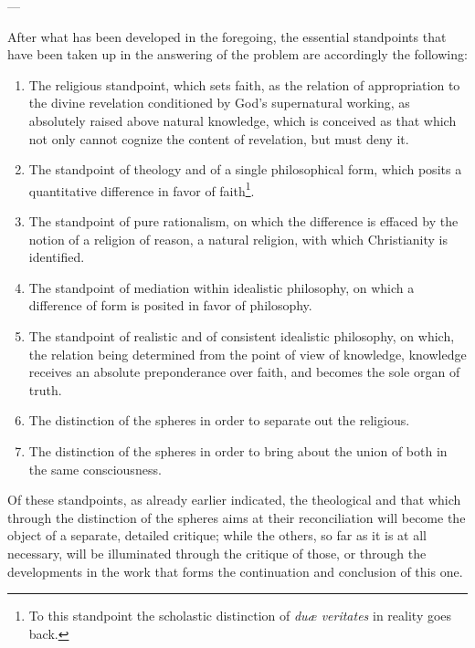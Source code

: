 \documentclass[12pt,a4paper]{book}
\begin{document}
\begin{center}
---
\end{center}

After what has been developed in the foregoing, the essential standpoints that
have been taken up in the answering of the problem are accordingly the
following:

\begin{enumerate}[label=\arabic*)]
\item The religious standpoint, which sets faith, as the relation of
  appropriation to the divine revelation conditioned by God's supernatural
  working, as absolutely raised above natural knowledge, which is conceived as
  that which not only cannot cognize the content of revelation, but must deny
  it.
\item The standpoint of theology and of a single philosophical form, which
  posits a quantitative difference in favor of faith\footnote{To this standpoint
  the scholastic distinction of \textit{duæ veritates} in reality goes back.}.
\item The standpoint of pure rationalism, on which the difference is effaced
  by the notion of a religion of reason, a natural religion, with which
  Christianity is identified.
\item The standpoint of mediation within idealistic philosophy, on which a
  difference of form is posited in favor of philosophy.
\item The standpoint of realistic and of consistent idealistic philosophy, on
  which, the relation being determined from the point of view of knowledge,
  knowledge receives an absolute preponderance over faith, and becomes the sole
  organ of truth.
\item The distinction of the spheres in order to separate out the religious.
\item The distinction of the spheres in order to bring about the union of both
  in the same consciousness.
\end{enumerate}

Of these standpoints, as already earlier indicated, the theological and that
which through the distinction of the spheres aims at their reconciliation will
become the object of a separate, detailed critique; while the others, so far as
it is at all necessary, will be illuminated through the critique of those, or
through the developments in the work that forms the continuation and conclusion
of this one.


\end{document}
